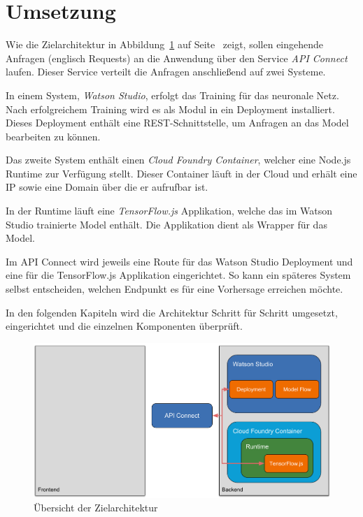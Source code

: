\section{Umsetzung}
Wie die Zielarchitektur in Abbildung~\ref{fig:umsetzung_zielarchitektur} auf
Seite~\pageref{fig:umsetzung_zielarchitektur} zeigt, sollen eingehende Anfragen (englisch Requests) an die Anwendung über
den Service \textit{API Connect} laufen. Dieser Service verteilt die Anfragen anschließend auf zwei Systeme.

In einem System, \textit{Watson Studio}, erfolgt das Training für das neuronale Netz. Nach erfolgreichem Training wird es
als Modul in ein Deployment installiert. Dieses Deployment enthält eine REST-Schnittstelle, um Anfragen an das Model
bearbeiten zu können.

Das zweite System enthält einen \textit{Cloud Foundry Container}, welcher eine Node.js Runtime zur Verfügung stellt. Dieser
Container läuft in der Cloud und erhält eine IP sowie eine Domain über die er aufrufbar ist.

In der Runtime läuft eine \textit{TensorFlow.js} Applikation, welche das im Watson Studio trainierte Model enthält. Die
Applikation dient als Wrapper für das Model.

Im API Connect wird jeweils eine Route für das Watson Studio Deployment und eine für die TensorFlow.js Applikation
eingerichtet. So kann ein späteres System selbst entscheiden, welchen Endpunkt es für eine Vorhersage erreichen möchte.

In den folgenden Kapiteln wird die Architektur Schritt für Schritt umgesetzt, eingerichtet und die einzelnen Komponenten
überprüft.

\begin{figure}[h]
    \centering
    \includegraphics[width=\textwidth]{images/kapitel_3/architektur_uebersicht.pdf}
    \caption{Übersicht der Zielarchitektur}
    \label{fig:umsetzung_zielarchitektur}
\end{figure}

